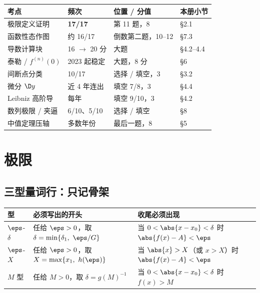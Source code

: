 \documentclass[UTF8,11pt]{ctexart}
\begin{document}

\begin{center}
\footnotesize
\renewcommand{\arraystretch}{1.1}
\begin{tabular}{@{}p{3.8cm}p{2.3cm}p{4.3cm}p{4.3cm}@{}}
\toprule
\textbf{考点} & \textbf{频次} & \textbf{位置 / 分值} & \textbf{本册小节} \\
\midrule
极限定义证明 & \textbf{17/17} & 第 11 题，8 & §2.1 \\
函数性态作图 & 约 16/17 & 倒数第二题，10--12 & §7.3 \\
导数计算块 & 16 $\to$ 20 分 & 大题 & §4.2--4.4 \\
泰勒 / $f^{(n)}(0)$ & 2023 起稳定 & 大题，8 分 & §6 \\
间断点分类 & 10/17 & 选择 / 填空，3 & §3.2 \\
微分 $\D y$ & 近 4 年连出 & 填空 7/8，3 & §4.4 \\
Leibniz 高阶导 & 每年 & 填空 9/10，3 & §4.2 \\
数列极限 / 夹逼 & 6/10、5/10 & 选择 / 填空 & §8 \\
中值定理压轴 & 多数年份 & 最后一题，8 & §5 \\
\bottomrule
\end{tabular}
\end{center}

\section{极限}

\subsection{三型量词行：只记骨架}

\begin{center}
\renewcommand{\arraystretch}{1.25}
\begin{tabular}{@{}p{2.5cm}p{6.0cm}p{6.2cm}@{}}
\toprule
\textbf{型} & \textbf{必须写出的开头} & \textbf{收尾必须出现} \\
\midrule
$\eps$-$\delta$ & 任给 $\eps>0$，取 $\delta=\min\{\delta_1,\ \eps/G\}$ & 当 $0<\abs{x-x_0}<\delta$ 时 $\abs{f(x)-A}<\eps$ \\
$\eps$-$X$ & 任给 $\eps>0$，取 $X=\max\{x_1,\ h(\eps)\}$ & 当 $\abs{x}>X$（或 $x>X$）时 $\abs{f(x)-A}<\eps$ \\
$M$ 型 & 任给 $M>0$，取 $\delta=g(M)^{-1}$ & 当 $0<\abs{x-x_0}<\delta$ 时 $f(x)>M$ \\
\bottomrule
\end{tabular}
\end{center}
\end{document}
